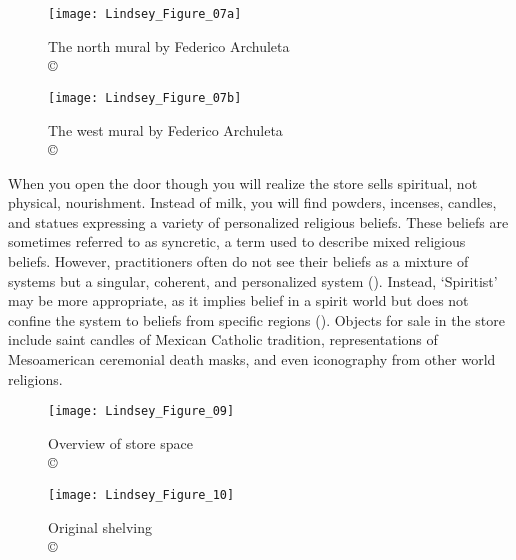 \begin{figure}[!p]
	\begin{minipage}[t]{.49\linewidth}
	\texttt{[image: Lindsey\_Figure\_07a]}
	\caption{The north mural by Federico Archuleta\\
		{\normalfont\scriptsize \copyright\
			\shortauthor
	}}
	\label{fig:Lindsey_Figure_07a}
\end{minipage}
\hfill
\begin{minipage}[t]{.49\linewidth}
	\texttt{[image: Lindsey\_Figure\_07b]}
	\caption{The west mural by Federico Archuleta\\
		{\normalfont\scriptsize \copyright\
			\shortauthor
	}}
	\label{fig:Lindsey_Figure_07b}
	\end{minipage}
\end{figure}


When you open the door though you will realize the store sells spiritual, not physical, nourishment. Instead of milk, you will find powders, incenses, candles, and statues expressing a variety of personalized religious beliefs. These beliefs are sometimes referred to as syncretic, a term used to describe mixed religious beliefs. However, practitioners often do not see their beliefs as a mixture of systems but a singular, coherent, and personalized system (\cites{romberg1998}{romberg2005}). Instead, ‘Spiritist’ may be more appropriate, as it implies belief in a spirit world but does not confine the system to beliefs from specific regions (\cite{romberg2005}). Objects for sale in the store include saint candles of Mexican Catholic tradition, representations of Mesoamerican ceremonial death masks, and even iconography from other world religions.

\begin{figure}[!p]
	\begin{minipage}[t]{.49\linewidth}
	\texttt{[image: Lindsey\_Figure\_09]}
	\caption{Overview of store space\\
		{\normalfont\scriptsize \copyright\
			\shortauthor
	}}
	\label{fig:Lindsey_Figure_09}
\end{minipage}
\hfill
\begin{minipage}[t]{.49\linewidth}
	\texttt{[image: Lindsey\_Figure\_10]}
	\caption{Original shelving\\
		{\normalfont\scriptsize \copyright\
			\shortauthor
	}}
	\label{fig:Lindsey_Figure_10}
	\end{minipage}
\end{figure}


